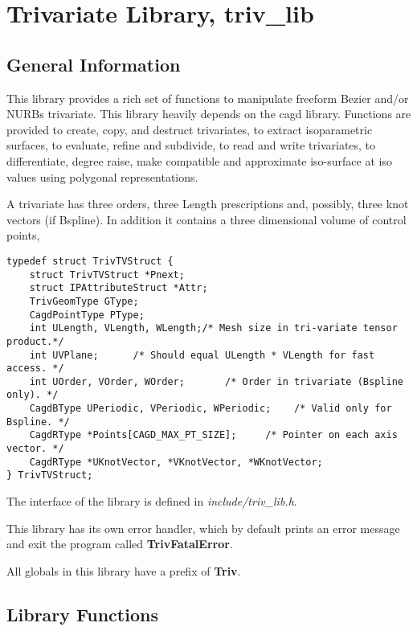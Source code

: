 {\chapter{Trivariate Library, triv\_lib}

\section{General Information}

This library provides a rich set of functions to manipulate freeform
Bezier and/or NURBs trivariate. This library heavily depends on the cagd
library. Functions are provided to create, copy, and destruct trivariates,
to extract isoparametric surfaces, to evaluate, refine and subdivide, to
read and write trivariates, to differentiate, degree raise, make compatible
and approximate iso-surface at iso values using polygonal representations.

A trivariate has three orders, three Length prescriptions and,
possibly, three knot vectors (if Bspline).  In addition it contains
a three dimensional volume of control points,
\begin{verbatim}
typedef struct TrivTVStruct {
    struct TrivTVStruct *Pnext;
    struct IPAttributeStruct *Attr;
    TrivGeomType GType;
    CagdPointType PType;
    int ULength, VLength, WLength;/* Mesh size in tri-variate tensor product.*/
    int UVPlane;	  /* Should equal ULength * VLength for fast access. */
    int UOrder, VOrder, WOrder;       /* Order in trivariate (Bspline only). */
    CagdBType UPeriodic, VPeriodic, WPeriodic;    /* Valid only for Bspline. */
    CagdRType *Points[CAGD_MAX_PT_SIZE];     /* Pointer on each axis vector. */
    CagdRType *UKnotVector, *VKnotVector, *WKnotVector;
} TrivTVStruct;
\end{verbatim}

The interface of the library is defined in {\em include/triv\_lib.h}. 

This library has its own error handler, which by default prints an
error message and exit the program called {\bf TrivFatalError}.

All globals in this library have a prefix of {\bf Triv}.

\section{Library Functions}


}
